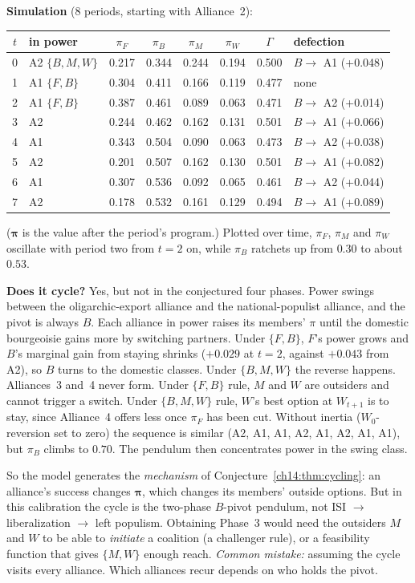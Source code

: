 \documentclass[../solutions_manual.tex]{subfiles}
\begin{document}
\textbf{Simulation} (8 periods, starting with Alliance~2):
\begin{center}
\small
\begin{tabular}{clcccccl}
\toprule
$t$ & in power & $\pi_F$ & $\pi_B$ & $\pi_M$ & $\pi_W$ & $\Gamma$ & defection \\
\midrule
0 & A2 $\{B,M,W\}$ & 0.217 & 0.344 & 0.244 & 0.194 & 0.500 & $B \to$ A1 (+0.048) \\
1 & A1 $\{F,B\}$ & 0.304 & 0.411 & 0.166 & 0.119 & 0.477 & none \\
2 & A1 $\{F,B\}$ & 0.387 & 0.461 & 0.089 & 0.063 & 0.471 & $B \to$ A2 (+0.014) \\
3 & A2 & 0.244 & 0.462 & 0.162 & 0.131 & 0.501 & $B \to$ A1 (+0.066) \\
4 & A1 & 0.343 & 0.504 & 0.090 & 0.063 & 0.473 & $B \to$ A2 (+0.038) \\
5 & A2 & 0.201 & 0.507 & 0.162 & 0.130 & 0.501 & $B \to$ A1 (+0.082) \\
6 & A1 & 0.307 & 0.536 & 0.092 & 0.065 & 0.461 & $B \to$ A2 (+0.044) \\
7 & A2 & 0.178 & 0.532 & 0.161 & 0.129 & 0.494 & $B \to$ A1 (+0.089) \\
\bottomrule
\end{tabular}
\end{center}
($\boldsymbol{\pi}$ is the value after the period's program.) Plotted over time, $\pi_F$, $\pi_M$ and $\pi_W$ oscillate with period two from $t = 2$ on, while $\pi_B$ ratchets up from $0.30$ to about $0.53$.

\textbf{Does it cycle?} Yes, but not in the conjectured four phases. Power swings between the oligarchic-export alliance and the national-populist alliance, and the pivot is always $B$. Each alliance in power raises its members' $\pi$ until the domestic bourgeoisie gains more by switching partners. Under $\{F,B\}$, $F$'s power grows and $B$'s marginal gain from staying shrinks ($+0.029$ at $t=2$, against $+0.043$ from A2), so $B$ turns to the domestic classes. Under $\{B,M,W\}$ the reverse happens. Alliances~3 and~4 never form. Under $\{F,B\}$ rule, $M$ and $W$ are outsiders and cannot trigger a switch. Under $\{B,M,W\}$ rule, $W$'s best option at $W_{t+1}$ is to stay, since Alliance~4 offers less once $\pi_F$ has been cut. Without inertia ($W_0$-reversion set to zero) the sequence is similar (A2, A1, A1, A2, A1, A2, A1, A1), but $\pi_B$ climbs to $0.70$. The pendulum then concentrates power in the swing class.

So the model generates the \emph{mechanism} of Conjecture~\ref{ch14:thm:cycling}: an alliance's success changes $\boldsymbol{\pi}$, which changes its members' outside options. But in this calibration the cycle is the two-phase $B$-pivot pendulum, not ISI $\to$ liberalization $\to$ left populism. Obtaining Phase~3 would need the outsiders $M$ and $W$ to be able to \emph{initiate} a coalition (a challenger rule), or a feasibility function that gives $\{M,W\}$ enough reach. \textit{Common mistake:} assuming the cycle visits every alliance. Which alliances recur depends on who holds the pivot.
\end{document}
